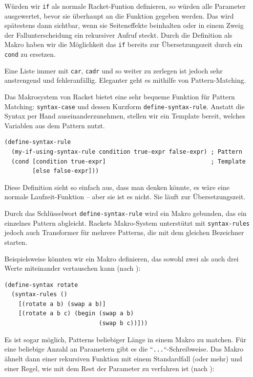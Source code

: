 Würden wir \texttt{if} als normale Racket-Funtion definieren, so würden alle Parameter ausgewertet, bevor sie überhaupt an die Funktion gegeben werden. Das wird spätestens dann sichtbar, wenn sie Seiteneffekte beinhalten oder in einem Zweig der Fallunterscheidung ein rekursiver Aufruf steckt. Durch die Definition als Makro haben wir die Möglichkeit das \texttt{if} bereits zur Übersetzungszeit durch ein \texttt{cond} zu ersetzen.


Eine Liste immer mit \texttt{car}, \texttt{cadr} und so weiter zu zerlegen ist jedoch sehr anstrengend und fehleranfällig. Eleganter geht es mithilfe von Pattern-Matching. %


Das Makrosystem von Racket bietet eine sehr bequeme Funktion für Pattern Matching: \texttt{syntax-case} und dessen Kurzform \texttt{define-syntax-rule}. Anstatt die Syntax per Hand auseinanderzunehmen, stellen wir ein Template bereit, welches Variablen aus dem Pattern nutzt.

\begin{lstlisting}
(define-syntax-rule 
  (my-if-using-syntax-rule condition true-expr false-expr) ; Pattern
  (cond [condition true-expr]                              ; Template
        [else false-expr]))
\end{lstlisting}

Diese Definition sieht so einfach aus, dass man denken könnte, es wäre eine normale Laufzeit-Funktion -- aber sie ist es nicht. Sie läuft zur Übersetzungszeit. 


Durch das Schlüsselwort \texttt{define-syntax-rule} wird ein Makro gebunden, das ein einzelnes Pattern abgleicht. Rackets Makro-System unterstützt mit \texttt{syntax-rules} jedoch auch Transformer für mehrere Patterns, die mit dem gleichen Bezeichner starten.

Beispielsweise könnten wir ein Makro definieren, das sowohl zwei als auch drei Werte miteinander vertauschen kann (nach \cite{racketguide-macros}):

\begin{lstlisting}
(define-syntax rotate
  (syntax-rules ()
    [(rotate a b) (swap a b)]
    [(rotate a b c) (begin (swap a b)
                           (swap b c))]))
\end{lstlisting}

Es ist sogar möglich, Patterns beliebiger Länge in einem Makro zu matchen. Für eine beliebige Anzahl an Parametern gibt es die ``\texttt{...}``-Schreibweise. Das Makro ähnelt dann einer rekursiven Funktion mit einem Standardfall (oder mehr) und einer Regel, wie mit dem Rest der Parameter zu verfahren ist (nach \cite{racketguide-macros}):

